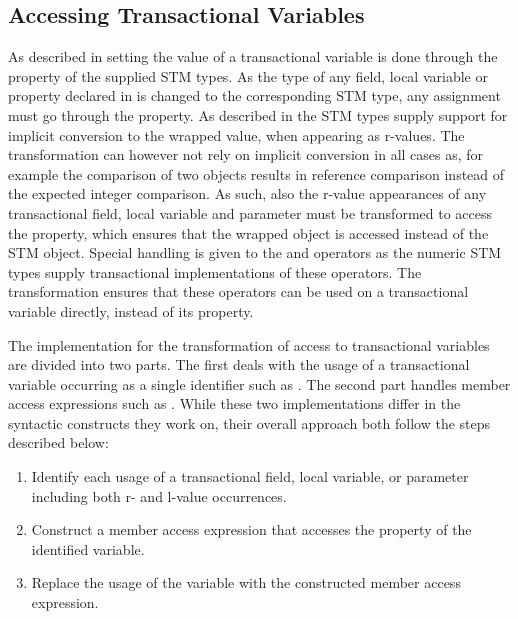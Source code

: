 \subsection{Accessing Transactional Variables}
\label{subsec:roslyn_extension_accessing_variables}
As described in  setting the value of a transactional variable is done through the  property of the supplied \ac{STM} types. As the type of any field, local variable or property declared  in \stmnamesp is changed to the corresponding \ac{STM} type, any assignment must go through the  property. As described in  the \ac{STM} types supply support for implicit conversion to the wrapped value, when appearing as r-values. The transformation can however not rely on implicit conversion in all cases as, for example the comparison of two  objects results in reference comparison instead of the expected integer comparison. As such, also the r-value appearances of any transactional field, local variable and parameter must be transformed to access the  property, which ensures that the wrapped object is accessed instead of the \ac{STM} object. Special handling is given to the \bscode{++} and \bscode{--} operators as the numeric \ac{STM} types supply transactional implementations of these operators. The transformation ensures that these operators can be used on a transactional variable directly, instead of its  property.

The implementation for the transformation of access to transactional variables are divided into two parts. The first deals with the usage of a transactional variable occurring as a single identifier such as . The second part handles member access expressions such as . While these two implementations differ in the syntactic constructs they work on, their overall approach both follow the steps described below:

\begin{enumerate}
	\item Identify each usage of a transactional field, local variable, or parameter including both r- and l-value occurrences.
	\item Construct a member access expression that accesses the  property of the identified variable.
	\item Replace the usage of the variable with the constructed member access expression. 
\end{enumerate}

